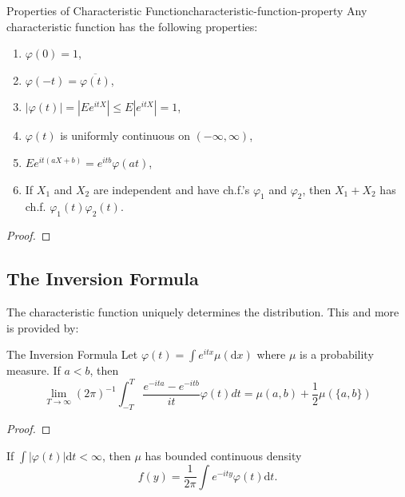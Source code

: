 \begin{theorem}{Properties of Characteristic Function}{characteristic-function-property}
    Any characteristic function has the following properties:
    \begin{enumerate}
        \item $\varphi(0) = 1$,
        \item $\varphi(-t) = \overline{\varphi(t)}$,
        \item $|\varphi(t)| =|Ee^{itX}| \leq E|e^{itX}| = 1$,
        \item $\varphi(t)$ is uniformly continuous on $(-\infty,\infty)$,
        \item $Ee^{it(aX+b)}=e^{itb}\varphi(at)$,
        \item  If $X_1$ and $X_2$ are independent and have ch.f.'s $\varphi_1$ and $\varphi_2$, then $X_1+X_2$ has ch.f. $\varphi_1(t)\varphi_2(t)$.
    \end{enumerate}
\end{theorem}

\begin{proof}
    
\end{proof}

\subsection{The Inversion Formula}

The characteristic function uniquely determines the distribution. This and more is provided by:
\begin{theorem}{The Inversion Formula}{}
    Let $\varphi(t)=\int e^{itx}\mu(\mathrm{d}x)$ where $\mu$ is a probability measure. If $a<b$, then
    \begin{equation}
        \lim _{T \rightarrow \infty}(2 \pi)^{-1} \int_{-T}^{T} \frac{e^{-i t a}-e^{-i t b}}{i t} \varphi(t) d t=\mu(a, b)+\frac{1}{2} \mu(\{a, b\})
    \end{equation}
\end{theorem}

\begin{proof}
    
\end{proof}

\begin{theorem}{}{}
    If $\int|\varphi(t)|\mathrm{d}t<\infty$, then $\mu$ has bounded continuous density
    \begin{equation}
        f(y)=\frac{1}{2\pi}\int e^{-ity}\varphi(t) \mathrm{d}t.
    \end{equation}
\end{theorem}

